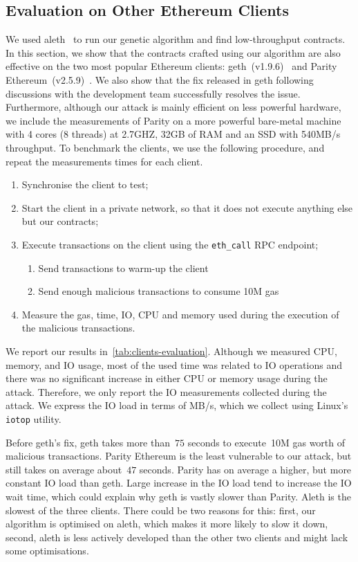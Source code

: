 \subsection{Evaluation on Other Ethereum Clients}
We used aleth~\cite{aleth} to run our genetic algorithm and find low-throughput contracts. In this section, we show that the contracts crafted using our algorithm are also effective on the two most popular Ethereum clients: geth~(v1.9.6)~\cite{geth} and Parity Ethereum~(v2.5.9)~\cite{parity-ethereum}. We also show that the fix released in geth following discussions with the development team successfully resolves the issue. Furthermore, although our attack is mainly efficient on less powerful hardware, we include the measurements of Parity on a more powerful bare-metal machine with 4 cores (8 threads) at 2.7GHZ, 32GB of RAM and an SSD with 540MB/s throughput.
%
To benchmark the clients, we use the following procedure, and repeat the measurements  times for each client.

\begin{enumerate}
\item Synchronise the client to test;
\item Start the client in a private network, so that it does not execute anything else but our contracts;
\item Execute transactions on the client using the \lstinline{eth_call} RPC endpoint;
  \begin{enumerate}
  \item Send transactions to warm-up the client
  \item Send enough malicious transactions to consume 10M gas
  \end{enumerate}
\item Measure the gas, time, IO, CPU and memory used during the execution of the malicious transactions.
\end{enumerate}
%
We report our results in~\autoref{tab:clients-evaluation}. Although we measured CPU, memory, and IO usage, most of the used time was related to IO operations and there was no significant increase in either CPU or memory usage during the attack. Therefore, we only report the IO measurements collected during the attack. We express the IO load in terms of MB/s, which we collect using Linux's \texttt{iotop} utility.

Before geth's fix, geth takes more than~$75$ seconds to execute~10M gas worth of malicious transactions. Parity Ethereum is the least vulnerable to our attack, but still takes on average about~$47$ seconds. Parity has on average a higher, but more constant IO load than geth. Large increase in the IO load tend to increase the IO wait time, which could explain why geth is vastly slower than Parity. Aleth is the slowest of the three clients. There could be two reasons for this: first, our algorithm is optimised on aleth, which makes it more likely to slow it down, second, aleth is less actively developed than the other two clients and might lack some optimisations.

